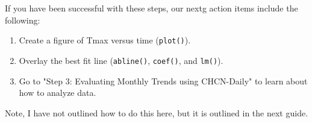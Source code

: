 \documentclass{article}\usepackage[]{graphicx}\usepackage[]{color}
\begin{document}

\noindent If you have been successful with these steps, our nextg action items include the following: 

\begin{enumerate}
  \item Create a figure of Tmax versus time (\texttt{plot()}).
  \item Overlay the best fit line (\texttt{abline()}, \texttt{coef()}, and \texttt{lm()}).
  \item Go to "Step 3: Evaluating Monthly Trends using CHCN-Daily" to learn about how to analyze data.
\end{enumerate}

Note, I have not outlined how to do this here, but it is outlined in the next guide. 
\end{document}
